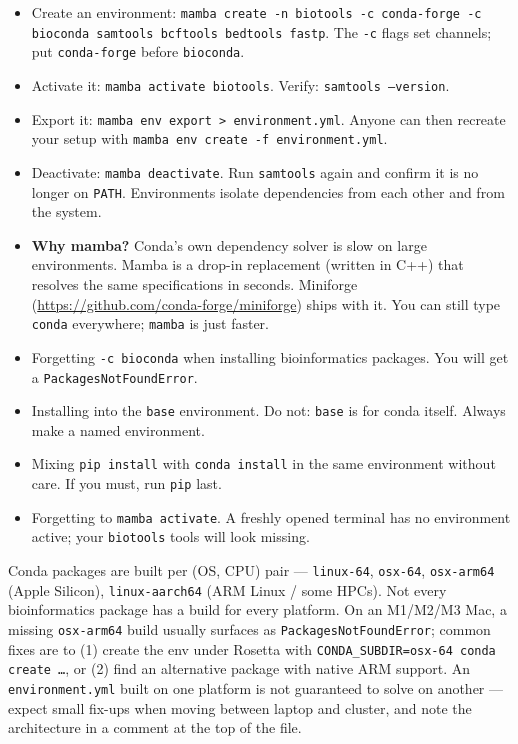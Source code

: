 \begin{itemize}[nosep]
  \item Create an environment: \texttt{mamba create -n biotools -c conda-forge -c bioconda samtools bcftools bedtools fastp}. The \texttt{-c} flags set channels; put \texttt{conda-forge} before \texttt{bioconda}.
  \item Activate it: \texttt{mamba activate biotools}. Verify: \texttt{samtools --version}.
  \item Export it: \texttt{mamba env export > environment.yml}. Anyone can then recreate your setup with \texttt{mamba env create -f environment.yml}.
  \item Deactivate: \texttt{mamba deactivate}. Run \texttt{samtools} again and confirm it is no longer on \texttt{PATH}. Environments isolate dependencies from each other and from the system.
  \item \textbf{Why mamba?} Conda's own dependency solver is slow on large environments. Mamba is a drop-in replacement (written in C++) that resolves the same specifications in seconds. Miniforge (\url{https://github.com/conda-forge/miniforge}) ships with it. You can still type \texttt{conda} everywhere; \texttt{mamba} is just faster.
\end{itemize}
\begin{tipbox}
\begin{itemize}[nosep]
  \item Forgetting \texttt{-c bioconda} when installing bioinformatics packages. You will get a \texttt{PackagesNotFoundError}.
  \item Installing into the \texttt{base} environment. Do not: \texttt{base} is for conda itself. Always make a named environment.
  \item Mixing \texttt{pip install} with \texttt{conda install} in the same environment without care. If you must, run \texttt{pip} last.
  \item Forgetting to \texttt{mamba activate}. A freshly opened terminal has no environment active; your \texttt{biotools} tools will look missing.
\end{itemize}
\end{tipbox}
\begin{warnbox}
Conda packages are built per (OS, CPU) pair --- \texttt{linux-64}, \texttt{osx-64}, \texttt{osx-arm64} (Apple Silicon), \texttt{linux-aarch64} (ARM Linux / some HPCs). Not every bioinformatics package has a build for every platform. On an M1/M2/M3 Mac, a missing \texttt{osx-arm64} build usually surfaces as \texttt{PackagesNotFoundError}; common fixes are to (1) create the env under Rosetta with \texttt{CONDA\_SUBDIR=osx-64 conda create \ldots}, or (2) find an alternative package with native ARM support. An \texttt{environment.yml} built on one platform is not guaranteed to solve on another --- expect small fix-ups when moving between laptop and cluster, and note the architecture in a comment at the top of the file.
\end{warnbox}
